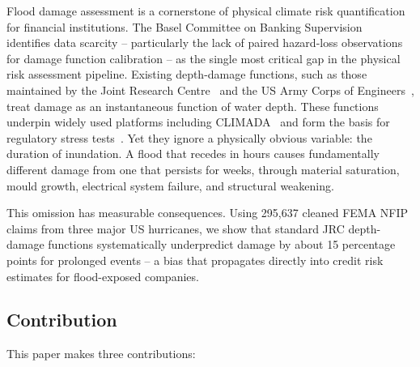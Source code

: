 Flood damage assessment is a cornerstone of physical climate risk quantification for financial institutions. The Basel Committee on Banking Supervision~\cite{basel2021a, basel2021b} identifies data scarcity  --  particularly the lack of paired hazard-loss observations for damage function calibration  --  as the single most critical gap in the physical risk assessment pipeline. Existing depth-damage functions, such as those maintained by the Joint Research Centre~\cite{huizinga2017global} and the US Army Corps of Engineers~\cite{usace2003}, treat damage as an instantaneous function of water depth. These functions underpin widely used platforms including CLIMADA~\cite{aznar2019climada} and form the basis for regulatory stress tests~\cite{ecb2025stress}. Yet they ignore a physically obvious variable: the duration of inundation. A flood that recedes in hours causes fundamentally different damage from one that persists for weeks, through material saturation, mould growth, electrical system failure, and structural weakening.

This omission has measurable consequences. Using 295{,}637 cleaned FEMA NFIP claims from three major US hurricanes, we show that standard JRC depth-damage functions systematically underpredict damage by about 15 percentage points for prolonged events -- a bias that propagates directly into credit risk estimates for flood-exposed companies.

\subsection{Contribution}

This paper makes three contributions:

